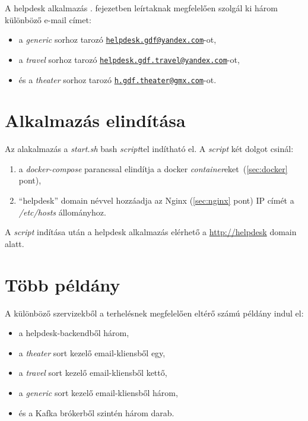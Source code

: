 A helpdesk alkalmazás . fejezetben leírtaknak megfelelően szolgál ki három különböző e-mail címet:

\begin{itemize}
	\item a \textit{generic} sorhoz tarozó  \href{mailto:helpdesk.gdf@yandex.com}{\nolinkurl{helpdesk.gdf@yandex.com}}-ot, 
	\item a \textit{travel} sorhoz tarozó  \href{mailto:helpdesk.gdf.travel@yandex.com}{\nolinkurl{helpdesk.gdf.travel@yandex.com}}-ot,
	\item és a \textit{theater} sorhoz tarozó  \href{mailto:h.gdf.theater@gmx.com}{\nolinkurl{h.gdf.theater@gmx.com}}-ot.
\end{itemize}



\section{Alkalmazás elindítása}\label{sec:elinditas}
Az alakalmazás a \textit{start.sh} bash \textit{script}tel indítható el. A \textit{script} két dolgot csinál:
\begin{enumerate}
	\item a \textit{docker-compose} parancssal elindítja a docker \textit{container}eket~(\ref{sec:docker} pont),
	\item  ``helpdesk'' domain névvel hozzáadja az Nginx (\ref{sec:nginx} pont) IP címét a \mbox{\textit{/etc/hosts}} állományhoz.
\end{enumerate}

A \textit{script} indítása után a helpdesk alkalmazás elérhető a  \href{http://helpdesk}{http://helpdesk} domain alatt.


\section{Több példány}
A különböző szervizekből a terhelésnek megfelelően eltérő számú példány indul el:

\begin{itemize}
	\item a helpdesk-backendből három,
	\item a \textit{theater} sort kezelő email-kliensből egy,
	\item a \textit{travel} sort kezelő email-kliensből kettő,
	\item a \textit{generic} sort kezelő email-kliensből három,
	\item és a Kafka brókerből szintén három darab.
\end{itemize}

